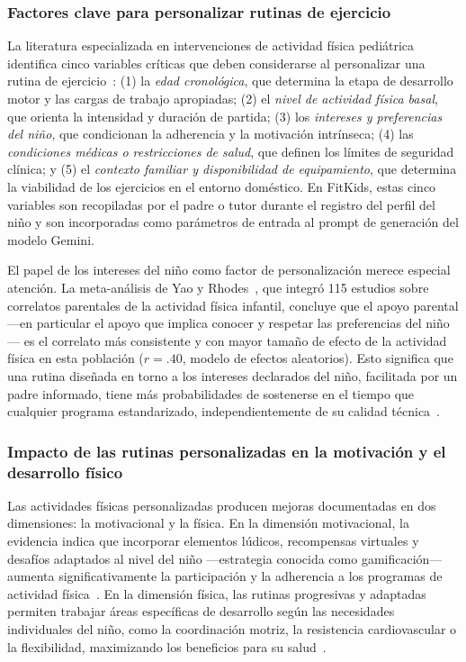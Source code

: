 			\subsubsection{Factores clave para personalizar rutinas de ejercicio}
				La literatura especializada en intervenciones de actividad física pediátrica identifica cinco variables críticas que deben considerarse al personalizar una rutina de ejercicio~\cite{Wilhite2023,Hesketh2017}: (1) la \textit{edad cronológica}, que determina la etapa de desarrollo motor y las cargas de trabajo apropiadas; (2) el \textit{nivel de actividad física basal}, que orienta la intensidad y duración de partida; (3) los \textit{intereses y preferencias del niño}, que condicionan la adherencia y la motivación intrínseca; (4) las \textit{condiciones médicas o restricciones de salud}, que definen los límites de seguridad clínica; y (5) el \textit{contexto familiar y disponibilidad de equipamiento}, que determina la viabilidad de los ejercicios en el entorno doméstico. En FitKids, estas cinco variables son recopiladas por el padre o tutor durante el registro del perfil del niño y son incorporadas como parámetros de entrada al prompt de generación del modelo Gemini.
				
				El papel de los intereses del niño como factor de personalización merece especial atención. La meta-análisis de Yao y Rhodes~\cite{Yao2015}, que integró 115 estudios sobre correlatos parentales de la actividad física infantil, concluye que el apoyo parental ---en particular el apoyo que implica conocer y respetar las preferencias del niño--- es el correlato más consistente y con mayor tamaño de efecto de la actividad física en esta población ($r = .40$, modelo de efectos aleatorios). Esto significa que una rutina diseñada en torno a los intereses declarados del niño, facilitada por un padre informado, tiene más probabilidades de sostenerse en el tiempo que cualquier programa estandarizado, independientemente de su calidad técnica~\cite{Yao2015,VegaDiaz2023}.


				\subsubsection{Impacto de las rutinas personalizadas en la motivación y el desarrollo físico}
				
				Las actividades físicas personalizadas producen mejoras documentadas en dos dimensiones: la motivacional y la física. En la dimensión motivacional, la evidencia indica que incorporar elementos lúdicos, recompensas virtuales y desafíos adaptados al nivel del niño ---estrategia conocida como gamificación--- aumenta significativamente la participación y la adherencia a los programas de actividad física~\cite{WangGamif2025}. En la dimensión física, las rutinas progresivas y adaptadas permiten trabajar áreas específicas de desarrollo según las necesidades individuales del niño, como la coordinación motriz, la resistencia cardiovascular o la flexibilidad, maximizando los beneficios para su salud~\cite{Wilhite2023}.
				

